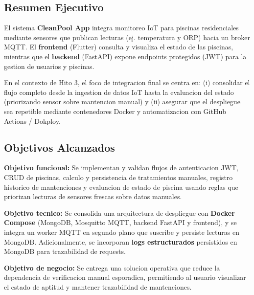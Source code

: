 \documentclass[11pt, a4paper]{article}
\begin{document}
\subsection{Resumen Ejecutivo}
El sistema \textbf{CleanPool App} integra monitoreo IoT para piscinas residenciales mediante sensores que publican lecturas (ej. temperatura y ORP) hacia un broker MQTT. El \textbf{frontend} (Flutter) consulta y visualiza el estado de las piscinas, mientras que el \textbf{backend} (FastAPI) expone endpoints protegidos (JWT) para la gestion de usuarios y piscinas.

En el contexto de Hito 3, el foco de integracion final se centra en: (i) consolidar el flujo completo desde la ingestion de datos IoT hasta la evaluacion del estado (priorizando sensor sobre mantencion manual) y (ii) asegurar que el despliegue sea repetible mediante contenedores Docker y automatizacion con GitHub Actions / Dokploy.

\subsection{Objetivos Alcanzados}
\textbf{Objetivo funcional:}
Se implementan y validan flujos de autenticacion JWT, CRUD de piscinas, calculo y persistencia de tratamientos manuales, registro historico de mantenciones y evaluacion de estado de piscina usando reglas que priorizan lecturas de sensores frescas sobre datos manuales.

\textbf{Objetivo tecnico:}
Se consolida una arquitectura de despliegue con \textbf{Docker Compose} (MongoDB, Mosquitto MQTT, backend FastAPI y frontend), y se integra un worker MQTT en segundo plano que suscribe y persiste lecturas en MongoDB. Adicionalmente, se incorporan \textbf{logs estructurados} persistidos en MongoDB para trazabilidad de requests.

\textbf{Objetivo de negocio:}
Se entrega una solucion operativa que reduce la dependencia de verificacion manual esporadica, permitiendo al usuario visualizar el estado de aptitud y mantener trazabilidad de mantenciones.
\end{document}
